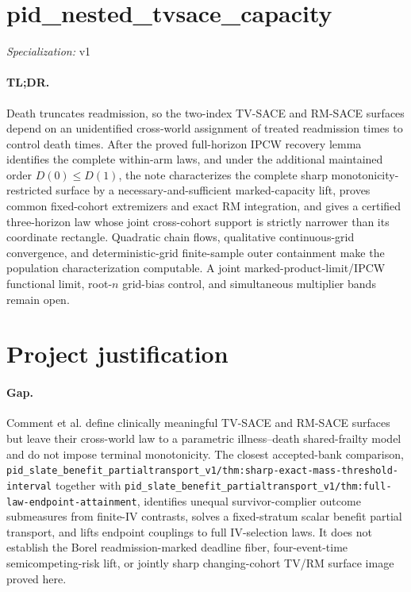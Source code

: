 \documentclass{article}
\begin{document}
\sloppy

\section*{pid\_\allowbreak{}nested\_\allowbreak{}tvsace\_\allowbreak{}capacity}

\noindent\textit{Specialization:} v1\par

\paragraph{TL;DR.} Death truncates readmission, so the two-index TV-SACE and RM-SACE surfaces depend on an unidentified cross-world assignment of treated readmission times to control death times. After the proved full-horizon IPCW recovery lemma identifies the complete within-arm laws, and under the additional maintained order \(D(0)\le D(1)\), the note characterizes the complete sharp monotonicity-restricted surface by a necessary-and-sufficient marked-capacity lift, proves common fixed-cohort extremizers and exact RM integration, and gives a certified three-horizon law whose joint cross-cohort support is strictly narrower than its coordinate rectangle. Quadratic chain flows, qualitative continuous-grid convergence, and deterministic-grid finite-sample outer containment make the population characterization computable. A joint marked-product-limit/IPCW functional limit, root-\(n\) grid-bias control, and simultaneous multiplier bands remain open.

\section{Project justification}

\paragraph{Gap.} Comment et al. define clinically meaningful TV-SACE and RM-SACE surfaces but leave their cross-world law to a parametric illness--death shared-frailty model and do not impose terminal monotonicity.  The closest accepted-bank comparison, \texttt{pid\_slate\_benefit\_partialtransport\_v1/thm:sharp-exact-mass-threshold-interval} together with \texttt{pid\_slate\_benefit\_partialtransport\_v1/thm:full-law-endpoint-attainment}, identifies unequal survivor-complier outcome submeasures from finite-IV contrasts, solves a fixed-stratum scalar benefit partial transport, and lifts endpoint couplings to full IV-selection laws.  It does not establish the Borel readmission-marked deadline fiber, four-event-time semicompeting-risk lift, or jointly sharp changing-cohort TV/RM surface image proved here.
\end{document}
